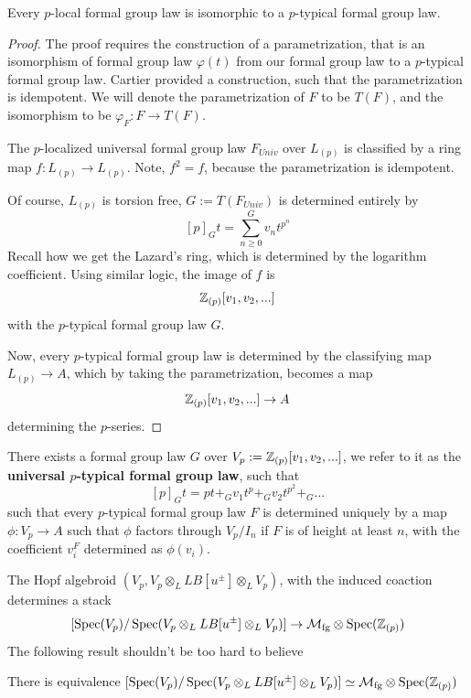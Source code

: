 \begin{theorem}
    Every $p$-local formal group law is isomorphic to a $p$-typical formal group law.
\end{theorem}

\begin{proof}
    The proof requires the construction of a parametrization, that is an isomorphism of formal group law $\varphi(t)$ from our formal group law to a $p$-typical formal group law. Cartier provided a construction, such that the parametrization is idempotent. We will denote the parametrization of $F$ to be $T(F)$, and the isomorphism to be $\varphi_F: F\to T(F)$.

    The $p$-localized universal formal group law $F_{Univ}$ over $L_{(p)}$ is classified by a ring map $f: L_{(p)}\to L_{(p)}$. Note, $f^2=f$, because the parametrization is idempotent. 

    Of course, $L_{(p)}$ is torsion free, $G:=T(F_{Univ})$ is determined entirely by 
    \[
    [p]_G t=\sum_{n\geq 0}^G v_nt^{p^n}
    \]
    Recall how we get the Lazard's ring, which is determined by the logarithm coefficient. Using similar logic, the image of $f$ is 
    \[
        \mathbb{Z}_{(p)}[v_1,v_2,...]
    \]with the $p$-typical formal group law $G$.

    Now, every $p$-typical formal group law is determined by the classifying map $L_{(p)}\to A$, which by taking the parametrization, becomes a map
    \[  \mathbb{Z}_{(p)}[v_1,v_2,...]\to A
    \]determining the $p$-series.
\end{proof}

\begin{theorem}
    There exists a formal group law $G$ over $V_p:=\mathbb{Z}_{(p)}[v_1,v_2,...]$, we refer to it as the \textbf{universal $p$-typical formal group law}, such that 
    \[
    [p]_Gt=pt+_Gv_1t^p+_Gv_2t^{p^2}+_G...
    \]such that every $p$-typical formal group law $F$ is determined uniquely by a map $\phi:V_p\to A$ such that $\phi$ factors through $V_p/I_n$ if $F$ is of height at least $n$, with the coefficient $v_i^F$ determined as $\phi(v_i)$.
\end{theorem}

The Hopf algebroid $(V_p, V_p\otimes_L LB[u^{\pm}]\otimes_L V_p)$, with the induced coaction determines a stack
\[
[\operatorname{\mathrm{Spec}}(V_p)/\operatorname{\mathrm{Spec}}(V_p\otimes_L LB[u^{\pm}]\otimes_L V_p)]\to \mathcal{M}_{\mathrm{fg}}\otimes \operatorname{\mathrm{Spec}}(\mathbb{Z}_{(p)})
\]
The following result shouldn't be too hard to believe 
\begin{proposition}
There is equivalence $[\operatorname{\mathrm{Spec}}(V_p)/\operatorname{\mathrm{Spec}}(V_p\otimes_L LB[u^{\pm}]\otimes_L V_p)]\simeq \mathcal{M}_{\mathrm{fg}}\otimes \operatorname{\mathrm{Spec}}(\mathbb{Z}_{(p)})$
\end{proposition}

